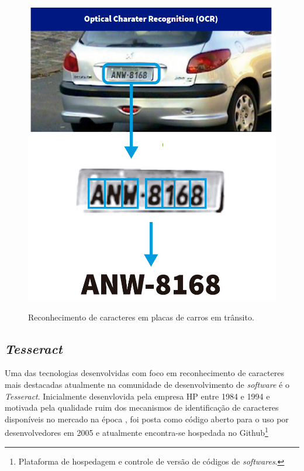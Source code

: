 \begin{figure}[h]
  \centering
  \caption{Reconhecimento de caracteres em placas de carros em trânsito.}
  \includegraphics[scale=0.4]{figuras/ocr-placa-carro.png}
  \label{fig:ocr-placa-carro}
\end{figure}

\subsection{\textit{Tesseract}} \label{ssec:tesseract}

Uma das tecnologias desenvolvidas com foco em reconhecimento de caracteres mais destacadas atualmente na comunidade de desenvolvimento de \textit{software} é o \textit{Tesseract}. Inicialmente desenvlovida pela empresa HP entre 1984 e 1994 e motivada pela qualidade ruim dos mecanismos de identificação de caracteres disponíveis no mercado na época \cite{tesseract-overview}, foi posta como código aberto para o uso por desenvolvedores em 2005 e atualmente encontra-se hospedada no Github\footnote{Plataforma de hospedagem e controle de versão de códigos de \textit{softwares}.}

